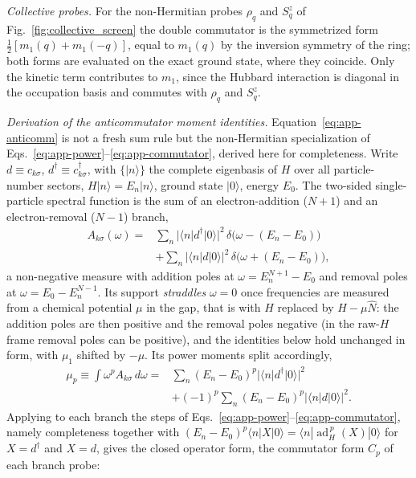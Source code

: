 \documentclass[submission, PhysCore]{SciPost}
\begin{document}
\begin{appendix}
\emph{Collective probes.} For the non-Hermitian probes $\rho_q$ and $S^z_q$ of Fig.~\ref{fig:collective_screen} the double commutator is the symmetrized form $\tfrac12[m_1(q)+m_1(-q)]$, equal to $m_1(q)$ by the inversion symmetry of the ring; both forms are evaluated on the exact ground state, where they coincide. Only the kinetic term contributes to $m_1$, since the Hubbard interaction is diagonal in the occupation basis and commutes with $\rho_q$ and $S^z_q$.

\emph{Derivation of the anticommutator moment identities.} Equation~\eqref{eq:app-anticomm} is not a fresh sum rule but the non-Hermitian specialization of Eqs.~\eqref{eq:app-power}--\eqref{eq:app-commutator}, derived here for completeness. Write $d\equiv c_{k\sigma}$, $d^\dagger\equiv c_{k\sigma}^\dagger$, with $\{|n\rangle\}$ the complete eigenbasis of $H$ over all particle-number sectors, $H|n\rangle=E_n|n\rangle$, ground state $|0\rangle$, energy $E_0$. The two-sided single-particle spectral function is the sum of an electron-addition ($N{+}1$) and an electron-removal ($N{-}1$) branch,
\begin{equation}
\begin{split}
A_{k\sigma}(\omega)={}&\sum_n|\langle n|d^\dagger|0\rangle|^2\,\delta\!\big(\omega-(E_n-E_0)\big)\\
&+\sum_n|\langle n|d|0\rangle|^2\,\delta\!\big(\omega+(E_n-E_0)\big),
\end{split}
\label{eq:app-twosided}
\end{equation}
a non-negative measure with addition poles at $\omega=E^{N+1}_n-E_0$ and removal poles at $\omega=E_0-E^{N-1}_n$. Its support \emph{straddles} $\omega=0$ once frequencies are measured from a chemical potential $\mu$ in the gap, that is with $H$ replaced by $H-\mu\hat N$: the addition poles are then positive and the removal poles negative (in the raw-$H$ frame removal poles can be positive), and the identities below hold unchanged in form, with $\mu_1$ shifted by $-\mu$. Its power moments split accordingly,
\begin{equation}
\begin{split}
\mu_p\equiv\int\omega^p A_{k\sigma}\,d\omega={}&\sum_n(E_n-E_0)^p|\langle n|d^\dagger|0\rangle|^2\\
&+(-1)^p\sum_n(E_n-E_0)^p|\langle n|d|0\rangle|^2 .
\end{split}
\end{equation}
Applying to each branch the steps of Eqs.~\eqref{eq:app-power}--\eqref{eq:app-commutator}, namely completeness together with ${(E_n-E_0)^p\langle n|X|0\rangle}$\allowbreak${{}=\langle n|\operatorname{ad}_H^{\,p}(X)|0\rangle}$ for $X=d^\dagger$ and $X=d$, gives the closed operator form, the commutator form $C_p$ of each branch probe:

\end{appendix}
\end{document}
